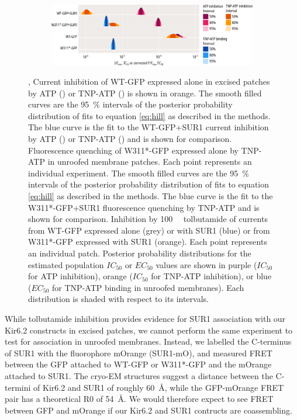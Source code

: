 \begin{figure}[h]
\begin{subfigure}[t]{0.9\textwidth}
		\centering
		\includegraphics[width=\textwidth]{nosur_ec50s.pdf}
	\end{subfigure}
	\caption[SUR1 dramatically alters inhibition but only subtly alters binding at Kir6.2]{
	,  Current inhibition of WT-GFP expressed alone in excised patches by ATP () or TNP-ATP () is shown in orange.
	The smooth filled curves are the \SI{95}{\percent} intervals of the posterior probability distribution of fits to equation \ref{eq:hill} as described in the methods.
	The blue curve is the fit to the WT-GFP+SUR1 current inhibition by ATP () or TNP-ATP () and is shown for comparison.
	 Fluorescence quenching of W311*-GFP expressed alone by TNP-ATP in unroofed membrane patches.
	Each point represents an individual experiment.
	The smooth filled curves are the \SI{95}{\percent} intervals of the posterior probability distribution of fits to equation \ref{eq:hill} as described in the methods.
	The blue curve is the fit to the W311*-GFP+SUR1 fluorescence quenching by TNP-ATP and is shown for comparison.
	 Inhibition by \SI{100}{\micro\Molar} tolbutamide of currents from WT-GFP expressed alone (grey) or with SUR1 (blue) or from W311*-GFP expressed with SUR1 (orange).
	Each point represents an individual patch.
	 Posterior probability distributions for the estimated population $IC_{50}$ or $EC_{50}$ values are shown in purple ($IC_{50}$ for ATP inhibition), orange ($IC_{50}$ for TNP-ATP inhibition), or blue ($EC_{50}$ for TNP-ATP binding in unroofed membranes).
	Each distribution is shaded with respect to its intervals.
	}\label{ch6fig:no_sur}
\end{figure}

While tolbutamide inhibition provides evidence for SUR1 association with our Kir6.2 constructs in excised patches, we cannot perform the same experiment to test for association in unroofed membranes.
Instead, we labelled the C-terminus of SUR1 with the fluorophore mOrange (SUR1-mO), and measured FRET between the GFP attached to WT-GFP or W311*-GFP and the mOrange attached to SUR1.
The cryo-EM structures suggest a distance between the C-termini of Kir6.2 and SUR1 of roughly \SI{60}{\angstrom}, while the GFP-mOrange FRET pair has a theoretical R0 of \SI{54}{\angstrom}.
We would therefore expect to see FRET between GFP and mOrange if our Kir6.2 and SUR1 contructs are coassembling.

